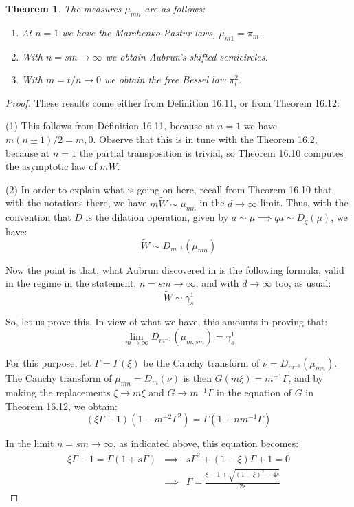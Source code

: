 \documentclass[12pt]{amsbook}
\newtheorem{theorem}{Theorem}[chapter]
\begin{document}
\begin{theorem}
The measures $\mu_{mn}$ are as follows:
\begin{enumerate}
\item At $n=1$ we have the Marchenko-Pastur laws, $\mu_{m1}=\pi_m$.

\item With $n=sm\to\infty$ we obtain Aubrun's shifted semicircles.

\item With $m=t/n\to 0$ we obtain the free Bessel law $\pi^2_t$.
\end{enumerate}
\end{theorem}

\begin{proof}
These results come either from Definition 16.11, or from Theorem 16.12:

\medskip

(1) This follows from Definition 16.11, because at $n=1$ we have $m(n\pm 1)/2=m,0$. Observe that this is in tune with the Theorem 16.2, because at $n=1$ the partial transposition is trivial, so Theorem 16.10 computes the asymptotic law of $mW$.

\medskip

(2) In order to explain what is going on here, recall from Theorem 16.10 that, with the notations there, we have $m\widetilde{W}\sim\mu_{mn}$ in the $d\to\infty$ limit. Thus, with the convention that $D$ is the dilation operation, given by $a\sim\mu\implies qa\sim D_q(\mu)$, we have:
$$\widetilde{W}\sim D_{m^{-1}}(\mu_{mn})$$

Now the point is that, what Aubrun discovered in \cite{aub} is the following formula, valid in the regime in the statement, $n=sm\to\infty$, and with $d\to\infty$ too, as usual:
$$\widetilde{W}\sim\gamma_s^1$$

So, let us prove this. In view of what we have, this amounts in proving that:
$$\lim_{m\to\infty}D_{m^{-1}}(\mu_{m,sm})=\gamma_s^1$$

For this purpose, let $\Gamma=\Gamma(\xi)$ be the Cauchy transform of $\nu=D_{m^{-1}}(\mu_{mn})$. The Cauchy transform of $\mu_{mn}=D_m(\nu)$ is then $G(m\xi)=m^{-1}\Gamma$, and by making the replacements $\xi\to m\xi$ and $G\to m^{-1}\Gamma$ in the equation of $G$ in Theorem 16.12, we obtain: 
$$(\xi\Gamma-1)(1-m^{-2}\Gamma^2)=\Gamma(1+nm^{-1}\Gamma)$$

In the limit $n=sm\to\infty$, as indicated above, this equation becomes:
\begin{eqnarray*}
\xi\Gamma-1=\Gamma(1+s\Gamma)
&\implies&s\Gamma^2+(1-\xi)\Gamma+1=0\\
&\implies&\Gamma=\frac{\xi-1\pm\sqrt{(1-\xi)^2-4s}}{2s}
\end{eqnarray*}


\end{proof}
\end{document}
